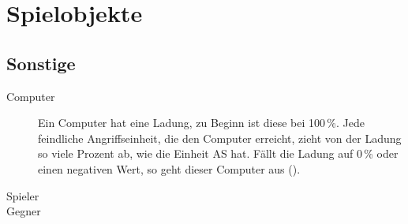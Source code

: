 \section{Spielobjekte}

%
%







\subsection{Sonstige}

\begin{description}
  \item[Computer] 
    Ein Computer hat eine Ladung, zu Beginn ist diese bei 100\,\%. Jede
    feindliche Angriffseinheit, die den Computer erreicht, zieht von der Ladung
    so viele Prozent ab, wie die Einheit AS hat. Fällt die Ladung auf 0\,\% oder
    einen negativen Wert, so geht dieser Computer aus ().

  \item[Spieler]

  \item[Gegner]
\end{description}
